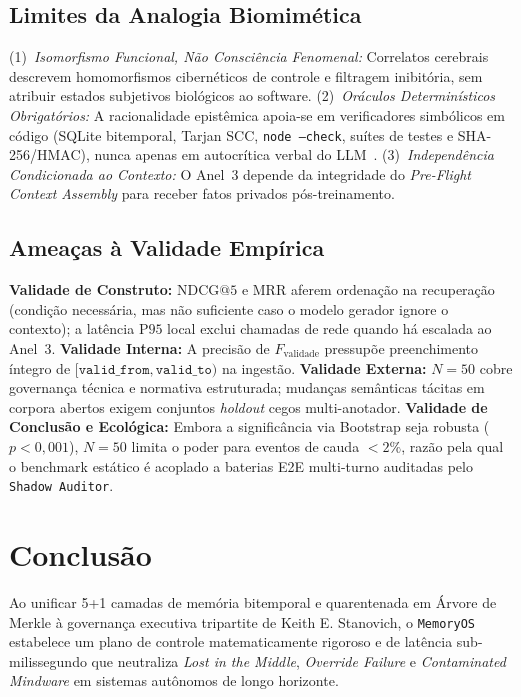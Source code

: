 \documentclass[10pt,twocolumn]{article}
\begin{document}
\subsection{Limites da Analogia Biomim\'etica}
(1)~\emph{Isomorfismo Funcional, N\~ao Consci\^encia Fenomenal:} Correlatos cerebrais descrevem homomorfismos cibern\'eticos de controle e filtragem inibit\'oria, sem atribuir estados subjetivos biol\'ogicos ao software. (2)~\emph{Or\'aculos Determin\'isticos Obrigat\'orios:} A racionalidade epist\^emica apoia-se em verificadores simb\'olicos em c\'odigo (SQLite bitemporal, Tarjan SCC, \texttt{node --check}, su\'ites de testes e SHA-256/HMAC), nunca apenas em autocr\'itica verbal do LLM~\cite{E28}. (3)~\emph{Independ\^encia Condicionada ao Contexto:} O Anel~3 depende da integridade do \emph{Pre-Flight Context Assembly} para receber fatos privados p\'os-treinamento.

\subsection{Amea\c{c}as \`a Validade Emp\'irica}
\textbf{Validade de Construto:} $\mathrm{NDCG@5}$ e $\mathrm{MRR}$ aferem ordena\c{c}\~ao na recupera\c{c}\~ao (condi\c{c}\~ao necess\'aria, mas n\~ao suficiente caso o modelo gerador ignore o contexto); a lat\^encia $\mathrm{P95}$ local exclui chamadas de rede quando h\'a escalada ao Anel~3. \textbf{Validade Interna:} A precis\~ao de $F_{\mathrm{validade}}$ pressup\~oe preenchimento \'integro de $[\texttt{valid\_from}, \texttt{valid\_to})$ na ingest\~ao. \textbf{Validade Externa:} $N=50$ cobre governan\c{c}a t\'ecnica e normativa estruturada; mudan\c{c}as sem\^anticas t\'acitas em corpora abertos exigem conjuntos \emph{holdout} cegos multi-anotador. \textbf{Validade de Conclus\~ao e Ecol\'ogica:} Embora a signific\^ancia via Bootstrap seja robusta ($p<0{,}001$), $N=50$ limita o poder para eventos de cauda $<2\%$, raz\~ao pela qual o benchmark est\'atico \'e acoplado a baterias E2E multi-turno auditadas pelo \texttt{Shadow Auditor}.

\section{Conclus\~ao}

Ao unificar 5+1 camadas de mem\'oria bitemporal e quarentenada em \'Arvore de Merkle \`a governan\c{c}a executiva tripartite de Keith E. Stanovich, o \texttt{MemoryOS} estabelece um plano de controle matematicamente rigoroso e de lat\^encia sub-milissegundo que neutraliza \emph{Lost in the Middle}, \emph{Override Failure} e \emph{Contaminated Mindware} em sistemas aut\^onomos de longo horizonte.
\end{document}
